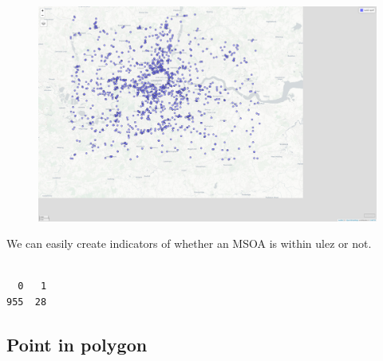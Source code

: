 \documentclass[
  letterpaper,
  DIV=11,
  numbers=noendperiod]{scrreprt}
\newenvironment{Shaded}{\begin{snugshade}}{\end{snugshade}}
\newcommand{\CommentTok}[1]{\textcolor[rgb]{0.37,0.37,0.37}{#1}}
\newcommand{\DecValTok}[1]{\textcolor[rgb]{0.68,0.00,0.00}{#1}}
\newcommand{\FunctionTok}[1]{\textcolor[rgb]{0.28,0.35,0.67}{#1}}
\newcommand{\NormalTok}[1]{\textcolor[rgb]{0.00,0.23,0.31}{#1}}
\newcommand{\OtherTok}[1]{\textcolor[rgb]{0.00,0.23,0.31}{#1}}
\newcommand{\SpecialCharTok}[1]{\textcolor[rgb]{0.37,0.37,0.37}{#1}}
\begin{document}
\begin{figure}[H]

{\centering \includegraphics{01_refresher_short_files/figure-pdf/unnamed-chunk-25-1.pdf}

}

\end{figure}

We can easily create indicators of whether an MSOA is within ulez or
not.

\begin{Shaded}
\end{Shaded}

\begin{verbatim}

  0   1 
955  28 
\end{verbatim}

\hypertarget{point-in-polygon}{%
\subsection{Point in polygon}\label{point-in-polygon}}
\end{document}
